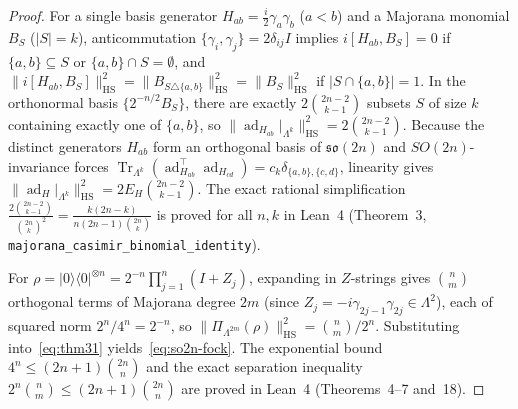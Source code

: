 \documentclass[11pt,a4paper]{article}
\theoremstyle{definition}
\theoremstyle{remark}
\newcommand{\Tr}{\operatorname{Tr}}
\newcommand{\ad}{\operatorname{ad}}
\newcommand{\HS}{\mathrm{HS}}
\newcommand{\so}{\mathfrak{so}}
\begin{document}
\begin{proof}
For a single basis generator $H_{ab} = \frac{i}{2}\gamma_a\gamma_b$ ($a<b$) and a Majorana monomial $B_S$ ($|S|=k$), anticommutation $\{\gamma_i,\gamma_j\} = 2\delta_{ij}I$ implies $i[H_{ab}, B_S] = 0$ if $\{a,b\}\subseteq S$ or $\{a,b\}\cap S = \emptyset$, and $\|i[H_{ab}, B_S]\|_{\HS}^2 = \|B_{S \triangle \{a,b\}}\|_{\HS}^2 = \|B_S\|_{\HS}^2$ if $|S \cap \{a,b\}| = 1$. In the orthonormal basis $\{2^{-n/2} B_S\}$, there are exactly $2\binom{2n-2}{k-1}$ subsets $S$ of size $k$ containing exactly one of $\{a,b\}$, so $\|\ad_{H_{ab}}|_{\Lambda^k}\|_{\HS}^2 = 2\binom{2n-2}{k-1}$. Because the distinct generators $H_{ab}$ form an orthogonal basis of $\so(2n)$ and $SO(2n)$-invariance forces $\Tr_{\Lambda^k}(\ad_{H_{ab}}^\top \ad_{H_{cd}}) = c_k \delta_{\{a,b\},\{c,d\}}$, linearity gives $\|\ad_H|_{\Lambda^k}\|_{\HS}^2 = 2 E_H \binom{2n-2}{k-1}$. The exact rational simplification $\frac{2\binom{2n-2}{k-1}}{\binom{2n}{k}^2} = \frac{k(2n-k)}{n(2n-1)\binom{2n}{k}}$ is proved for all $n,k$ in Lean~4 (Theorem~3, \texttt{majorana\_casimir\_binomial\_identity}).

For $\rho = |0\rangle\langle 0|^{\otimes n} = 2^{-n}\prod_{j=1}^n (I + Z_j)$, expanding in $Z$-strings gives $\binom{n}{m}$ orthogonal terms of Majorana degree $2m$ (since $Z_j = -i\gamma_{2j-1}\gamma_{2j} \in \Lambda^2$), each of squared norm $2^n / 4^n = 2^{-n}$, so $\|\Pi_{\Lambda^{2m}}(\rho)\|_{\HS}^2 = \binom{n}{m}/2^n$. Substituting into~\eqref{eq:thm31} yields~\eqref{eq:so2n-fock}. The exponential bound $4^n \le (2n+1)\binom{2n}{n}$ and the exact separation inequality $2^n \binom{n}{m} \le (2n+1)\binom{2n}{n}$ are proved in Lean~4 (Theorems~4--7 and~18).


\end{proof}
\end{document}
